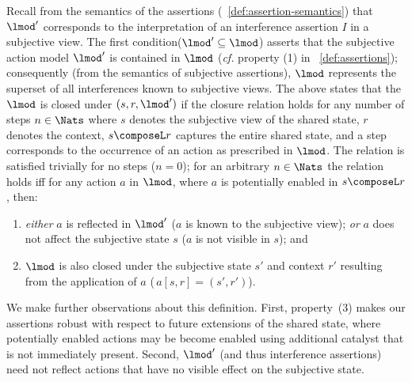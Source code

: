 %
Recall from the semantics of the assertions (~\ref{def:assertion-semantics}) that $\lmod'$ corresponds to the interpretation of an interference assertion $I$ in a subjective view. The first condition($\lmod' \subseteq\lmod$) asserts that the subjective action model $\lmod'$ is contained in $\lmod$ ({\it cf.} property (1) in ~\ref{def:assertions}); consequently (from the semantics of subjective assertions), $\lmod$ represents the superset of all interferences known to subjective views.
The above states that the $\lmod$ is closed under $(s, r, \lmod')$ if the closure relation holds for any number of steps $n \in \Nats$ where $s$ denotes the subjective view of the shared state, $r$ denotes the context, $s \composeL r$ captures the entire shared state, and a step corresponds to the occurrence of an action as prescribed in $\lmod$.
%
The relation is satisfied trivially for no steps ($n = 0$); for an arbitrary $n\in \Nats$ the relation holds iff for any action $a$ in $\lmod$, where $a$ is potentially enabled in $s \composeL r$, then:	\vspace*{-5pt}
\begin{enumerate}\renewcommand{\theenumi}{\alph{enumi}}
	\item \textit{either} $a$ is reflected in $\lmod'$ ($a$ is known to the subjective view); 
	\textit{or} $a$ does not affect the subjective state $s$ ($a$ is not visible in $s$); and 
	\item $\lmod$ is also closed under the subjective state $s'$ and context $r'$ resulting from the application of $a$ ($\,a[s, r]= (s', r')$).\vspace*{-5pt}
\end{enumerate}
%
%
We make further observations about this definition. First, property~(3) makes our assertions robust with respect to future extensions of the shared state, where potentially enabled actions may be become enabled using additional catalyst that is not immediately present. Second, $\lmod'$ (and thus interference assertions) need not reflect actions that have no visible effect on the subjective state.\\

